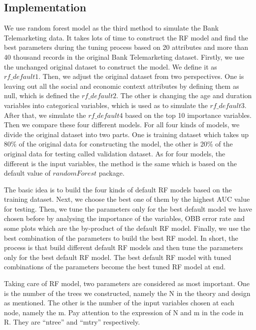 \documentclass[12pt, a4paper, bibliography=totoc, english]{scrartcl}
\begin{document}
\subsection{Implementation}
We use random forest model as the third method to simulate the Bank Telemarketing data. It takes lots of time to construct the RF model and find the best parameters during the tuning process based on 20 attributes and more than 40 thousand records in the original Bank Telemarketing dataset.  Firstly, we use the unchanged original dataset to construct the model. We define it as $rf\_default1$. Then, we adjust the original dataset from two perspectives. One is leaving out all the social and economic context attributes by defining them as null, which is defined the $rf\_default2$. The other is changing the age and duration variables into categorical variables, which is used as to simulate the $rf\_default3$. After that, we simulate the $rf\_default4$ based on the top 10 importance variables. Then we compare these four different models. For all four kinds of models, we divide the original dataset into two parts. One is training dataset which takes up 80\% of the original data for constructing the model, the other is 20\% of the original data for testing called validation dataset. As for four models, the different is the input variables, the method is the same which is based on the default value of $randomForest$ package.


The basic idea is to build the four kinds of default RF models based on the training dataset. Next, we choose the best one of them by the highest AUC value for testing. Then, we tune the parameters only for the best default model we have chosen before by analysing the importance of the variables, OBB error rate and some plots which are the by-product of the default RF model. Finally, we use the best combination of the parameters to build the best RF model. In short, the process is that build different default RF models and then tune the parameters only for the best default RF model. The best default RF model with tuned combinations of the parameters become the best tuned RF model at end. 


Taking care of RF model, two parameters are considered as most important. One is the number of the trees we constructed, namely the N in the theory and design as mentioned. The other is the number of the input variables chosen at each node, namely the m. Pay attention to the expression of N and m in the code in R. They are ``ntree'' and ``mtry'' respectively. 
\end{document}
